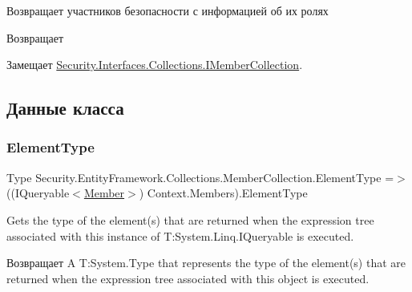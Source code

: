 Возвращает участников безопасности с информацией об их ролях 

\begin{DoxyReturn}{Возвращает}

\end{DoxyReturn}


Замещает \hyperlink{interface_security_1_1_interfaces_1_1_collections_1_1_i_member_collection_a3252217f6eba5387ead1faff427bb43a}{Security.\+Interfaces.\+Collections.\+I\+Member\+Collection}.



\subsection{Данные класса}
\mbox{\label{class_security_1_1_entity_framework_1_1_collections_1_1_member_collection_aecc1eacf6910c5ffa7d8f3401f8cc814}} 
\subsubsection{\texorpdfstring{Element\+Type}{ElementType}}
{\footnotesize\ttfamily Type Security.\+Entity\+Framework.\+Collections.\+Member\+Collection.\+Element\+Type =$>$ ((I\+Queryable$<$\hyperlink{class_security_1_1_model_1_1_member}{Member}$>$) Context.\+Members).Element\+Type}



Gets the type of the element(s) that are returned when the expression tree associated with this instance of T\+:\+System.\+Linq.\+I\+Queryable is executed. 

\begin{DoxyReturn}{Возвращает}
A T\+:\+System.\+Type that represents the type of the element(s) that are returned when the expression tree associated with this object is executed. 
\end{DoxyReturn}
\mbox{\label{class_security_1_1_entity_framework_1_1_collections_1_1_member_collection_a9abd92eeb0b2c3c20c6d20022bf67756}} 

